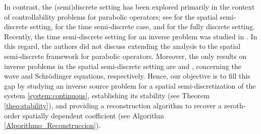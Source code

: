 \documentclass{amsart}
\numberwithin{equation}{section}
\begin{document}
\par In contrast, the (semi)discrete setting has been explored primarily in the context of controllability problems for parabolic operators; see \cite{BLR-2014,CLNP2022,N:2014} for the spatial semi-discrete setting, \cite{BHS2020} for the time semi-discrete case, and \cite{GCHS2021,LPP:2024} for the fully discrete setting. Recently, the time semi-discrete setting for an inverse problem was studied in \cite{Klibanov2024_tiempo_discreto}. In this regard, the authors did not discuss extending the analysis to the spatial semi-discrete framework for parabolic operators. Moreover, the only results on inverse problems in the spatial semi-discrete setting are \cite{BEO-2015,ZZ-2022} and \cite{ZZ-2023}, concerning the wave and Schrödinger equations, respectively. Hence, our objective is to fill this gap by studying an inverse source problem for a spatial semi-discretization of the system \eqref{system:continuous}, establishing its stability (see Theorem \ref{theo:stability}), and providing a reconstruction algorithm to recover a zeroth-order spatially dependent coefficient (see Algorithm \ref{Alporithmo_Reconstruccion}).
\end{document}
